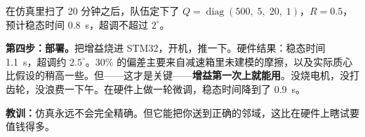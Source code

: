 \begin{mdframed}[linewidth=1pt, innertopmargin=10pt, innerbottommargin=10pt]
在仿真里扫了 20 分钟之后，队伍定下了 $Q = \operatorname{diag}(500,\; 5,\; 20,\; 1)$，$R = 0.5$，预计稳态时间 0.8~s，超调不超过 $2^\circ$。

\textbf{第四步：部署。}把增益烧进 STM32，开机，推一下。硬件结果：稳态时间 1.1~s，超调约 $2.5^\circ$。30\% 的偏差主要来自减速箱里未建模的摩擦，以及实际质心比假设的稍高一些。但——这才是关键——\textbf{增益第一次上就能用}。没烧电机，没打齿轮，没浪费一下午。在硬件上做一轮微调，稳态时间降到了 0.9~s。

\textbf{教训：}仿真永远不会完全精确。但它能把你送到正确的邻域，这比在硬件上瞎试要值钱得多。
\end{mdframed}
